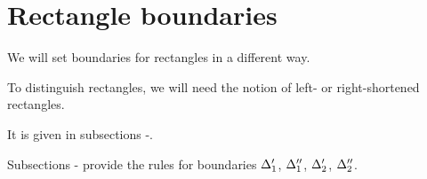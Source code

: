 \section{Rectangle boundaries}
\label{section_boundaries}


We will set boundaries for rectangles in a different way.

To distinguish rectangles, we will need the notion of left- or right-shortened rectangles.

It is given in subsections -.

Subsections -
provide the rules for boundaries $\Delta_1'$, $\Delta_1''$, $\Delta_2'$, $\Delta_2''$.





